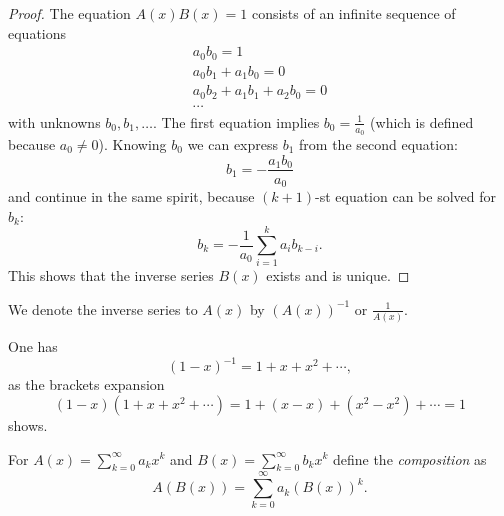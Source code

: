 \begin{page}
\setcounter{section}{2}
\setcounter{subsection}{2}
\setcounter{dfn}{3}
\label{portion:829}

\begin{proof}
The equation $A(x)B(x) = 1$ consists of an infinite sequence of equations
\begin{gather*}
a_0b_0 = 1\\
a_0b_1 + a_1b_0 = 0\\
a_0b_2 + a_1b_1 + a_2b_0 = 0\\
\cdots
\end{gather*}
with unknowns $b_0, b_1, \ldots$.
The first equation implies $b_0 = \frac{1}{a_0}$ (which is defined because $a_0 \ne 0$).
Knowing $b_0$ we can express $b_1$ from the second equation:
\[
b_1 = -\frac{a_1b_0}{a_0}
\]
and continue in the same spirit, because $(k+1)$-st equation can be solved for $b_k$:
\[
b_k = -\frac{1}{a_0}\sum_{i=1}^k a_ib_{k-i}.
\]
This shows that the inverse series $B(x)$ exists and is unique.
\end{proof}

We denote the inverse series to $A(x)$ by $(A(x))^{-1}$ or $\frac{1}{A(x)}$.


\end{page}

\begin{page}
\setcounter{section}{2}
\setcounter{subsection}{2}
\setcounter{dfn}{4}
\label{portion:831}

\begin{exl}
One has
\[
(1-x)^{-1} = 1 + x + x^2 + \cdots,
\]
as the brackets expansion
\[
(1-x)(1+x+x^2+\cdots) = 1 + (x - x) + (x^2 - x^2) + \cdots = 1
\]
shows.
\end{exl}

\end{page}

\begin{page}
\setcounter{section}{2}
\setcounter{subsection}{2}
\setcounter{dfn}{5}
\label{portion:834}

\begin{dfn}
For $A(x) = \sum_{k=0}^\infty a_k x^k$ and $B(x) = \sum_{k=0}^\infty b_k x^k$ define the \emph{composition} as
\[
A(B(x)) = \sum_{k=0}^\infty a_k (B(x))^k.
\]
\end{dfn}

\end{page}

